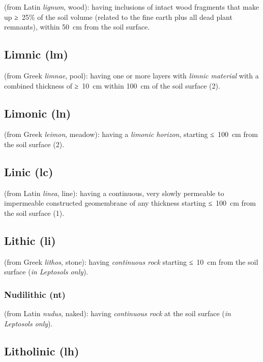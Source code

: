 \documentclass[
  letterpaper,
  DIV=11,
  numbers=noendperiod]{scrreprt}
\begin{document}
(from Latin \emph{lignum}, wood): having inclusions of intact wood
fragments that make up ≥~25\% of the soil volume (related to the fine
earth plus all dead plant remnants), within 50~cm from the soil surface.

\hypertarget{limnic-lm}{%
\subsection{Limnic (lm)}\label{limnic-lm}}

(from Greek \emph{limnae}, pool): having one or more layers with
\emph{limnic material} with a combined thickness of ≥~10~cm within
100~cm of the soil surface (2).

\hypertarget{limonic-ln}{%
\subsection{Limonic (ln)}\label{limonic-ln}}

(from Greek \emph{leimon}, meadow): having a \emph{limonic horizon},
starting ≤~100~cm from the soil surface (2).

\hypertarget{linic-lc}{%
\subsection{Linic (lc)}\label{linic-lc}}

(from Latin \emph{linea}, line): having a continuous, very slowly
permeable to impermeable constructed geomembrane of any thickness
starting ≤~100~cm from the soil surface (1).

\hypertarget{lithic-li}{%
\subsection{Lithic (li)}\label{lithic-li}}

(from Greek \emph{lithos}, stone): having \emph{continuous rock}
starting ≤~10~cm from the soil surface (\emph{in Leptosols only}).

\hypertarget{nudilithic-nt}{%
\subsubsection{Nudilithic (nt)}\label{nudilithic-nt}}

(from Latin \emph{nudus}, naked): having \emph{continuous rock} at the
soil surface (\emph{in Leptosols only}).

\hypertarget{litholinic-lh}{%
\subsection{Litholinic (lh)}\label{litholinic-lh}}
\end{document}
